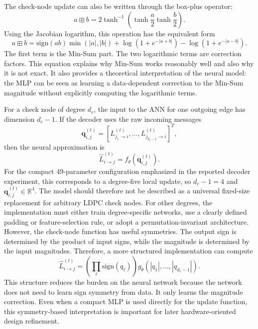 The check-node update can also be written through the box-plus operator:
\begin{equation}
  a\boxplus b
  =
  2\tanh^{-1}\left(\tanh\frac{a}{2}\tanh\frac{b}{2}\right).
\end{equation}
Using the Jacobian logarithm, this operation has the equivalent form
\begin{equation}
  a\boxplus b
  =
  \mathrm{sign}(ab)\min(|a|,|b|)
  +\log\left(1+e^{-|a+b|}\right)
  -\log\left(1+e^{-|a-b|}\right).
\end{equation}
The first term is the Min-Sum part. The two logarithmic terms are correction factors. This equation explains why Min-Sum works reasonably well and also why it is not exact. It also provides a theoretical interpretation of the neural model: the MLP can be seen as learning a data-dependent correction to the Min-Sum magnitude without explicitly computing the logarithmic terms.

For a check node of degree $d_c$, the input to the ANN for one outgoing edge has dimension $d_c-1$. If the decoder uses the raw incoming messages
\begin{equation}
  \mathbf{q}_{i,j}^{(t)}
  =
  [L_{j_1\rightarrow i}^{(t)},\ldots,L_{j_{d_c-1}\rightarrow i}^{(t)}]^T,
\end{equation}
then the neural approximation is
\begin{equation}
  \hat{L}_{i\rightarrow j}^{(t)}
  =
  f_\theta(\mathbf{q}_{i,j}^{(t)}).
\end{equation}
For the compact 49-parameter configuration emphasized in the reported decoder experiment, this corresponds to a degree-five local update, so $d_c-1=4$ and $\mathbf{q}_{i,j}^{(t)}\in\mathbb{R}^4$. The model should therefore not be described as a universal fixed-size replacement for arbitrary LDPC check nodes. For other degrees, the implementation must either train degree-specific networks, use a clearly defined padding or feature-selection rule, or adopt a permutation-invariant architecture.
However, the check-node function has useful symmetries. The output sign is determined by the product of input signs, while the magnitude is determined by the input magnitudes. Therefore, a more structured implementation can compute
\begin{equation}
  \hat{L}_{i\rightarrow j}^{(t)}
  =
  \left(\prod_{\ell}\mathrm{sign}(q_\ell)\right)
  g_\theta(|q_1|,\ldots,|q_{d_c-1}|).
\end{equation}
This structure reduces the burden on the neural network because the network does not need to learn sign symmetry from data. It only learns the magnitude correction. Even when a compact MLP is used directly for the update function, this symmetry-based interpretation is important for later hardware-oriented design refinement.


